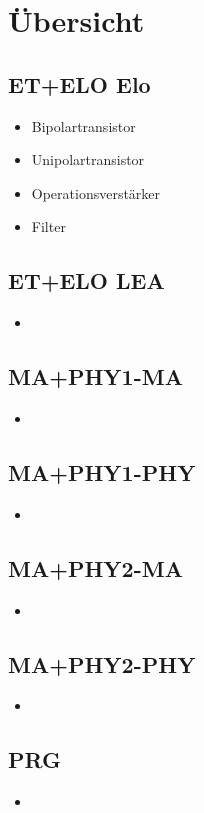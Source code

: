 
\section{Übersicht}

\subsection{ET+ELO Elo}
\begin{itemize}
  \item Bipolartransistor
  \item Unipolartransistor
  \item Operationsverstärker
  \item Filter
\end{itemize}

\subsection{ET+ELO LEA}
\begin{itemize}
  \item 
\end{itemize}

\subsection{MA+PHY1-MA}
\begin{itemize}
  \item 
\end{itemize}

\subsection{MA+PHY1-PHY}
\begin{itemize}
  \item 
\end{itemize}

\subsection{MA+PHY2-MA}
\begin{itemize}
  \item 
\end{itemize}

\subsection{MA+PHY2-PHY}
\begin{itemize}
  \item 
\end{itemize}

\subsection{PRG}
\begin{itemize}
  \item 
\end{itemize}
